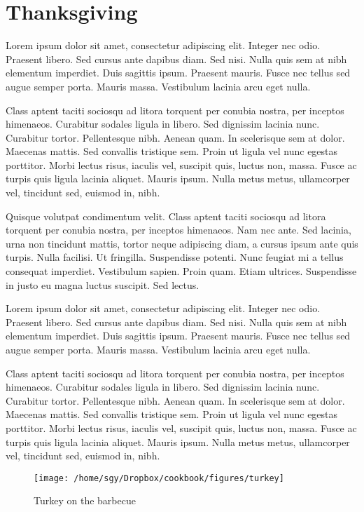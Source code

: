 \documentclass[12pt, draft]{book}
\begin{document}
\chapter{Thanksgiving}\label{chapter2}

Lorem ipsum dolor sit amet, consectetur adipiscing elit. Integer nec
odio. Praesent libero. Sed cursus ante dapibus diam. Sed nisi. Nulla
quis sem at nibh elementum imperdiet. Duis sagittis ipsum. Praesent
mauris. Fusce nec tellus sed augue semper porta. Mauris
massa. Vestibulum lacinia arcu eget nulla.

Class aptent taciti sociosqu ad litora torquent per conubia nostra,
per inceptos himenaeos. Curabitur sodales ligula in libero. Sed
dignissim lacinia nunc. Curabitur tortor. Pellentesque nibh. Aenean
quam. In scelerisque sem at dolor. Maecenas mattis. Sed convallis
tristique sem. Proin ut ligula vel nunc egestas porttitor. Morbi
lectus risus, iaculis vel, suscipit quis, luctus non, massa. Fusce ac
turpis quis ligula lacinia aliquet. Mauris ipsum. Nulla metus metus,
ullamcorper vel, tincidunt sed, euismod in, nibh.


Quisque volutpat condimentum velit. Class aptent taciti sociosqu ad
litora torquent per conubia nostra, per inceptos himenaeos. Nam nec
ante. Sed lacinia, urna non tincidunt mattis, tortor neque adipiscing
diam, a cursus ipsum ante quis turpis. Nulla facilisi. Ut
fringilla. Suspendisse potenti. Nunc feugiat mi a tellus consequat
imperdiet. Vestibulum sapien. Proin quam. Etiam ultrices. Suspendisse
in justo eu magna luctus suscipit. Sed lectus.

Lorem ipsum dolor sit amet, consectetur adipiscing elit. Integer nec
odio. Praesent libero. Sed cursus ante dapibus diam. Sed nisi. Nulla
quis sem at nibh elementum imperdiet. Duis sagittis ipsum. Praesent
mauris. Fusce nec tellus sed augue semper porta. Mauris
massa. Vestibulum lacinia arcu eget nulla.

Class aptent taciti sociosqu ad litora torquent per conubia nostra,
per inceptos himenaeos. Curabitur sodales ligula in libero. Sed
dignissim lacinia nunc. Curabitur tortor. Pellentesque nibh. Aenean
quam. In scelerisque sem at dolor. Maecenas mattis. Sed convallis
tristique sem. Proin ut ligula vel nunc egestas porttitor. Morbi
lectus risus, iaculis vel, suscipit quis, luctus non, massa. Fusce ac
turpis quis ligula lacinia aliquet. Mauris ipsum. Nulla metus metus,
ullamcorper vel, tincidunt sed, euismod in, nibh.

\begin{figure}[t]
\begin{center}
\texttt{[image: /home/sgy/Dropbox/cookbook/figures/turkey]}
\end{center}
\caption*{Turkey on the barbecue}
\end{figure}
\clearpage

\newpage

\newpage

\newpage

\newpage

\newpage

\newpage


\end{document}
